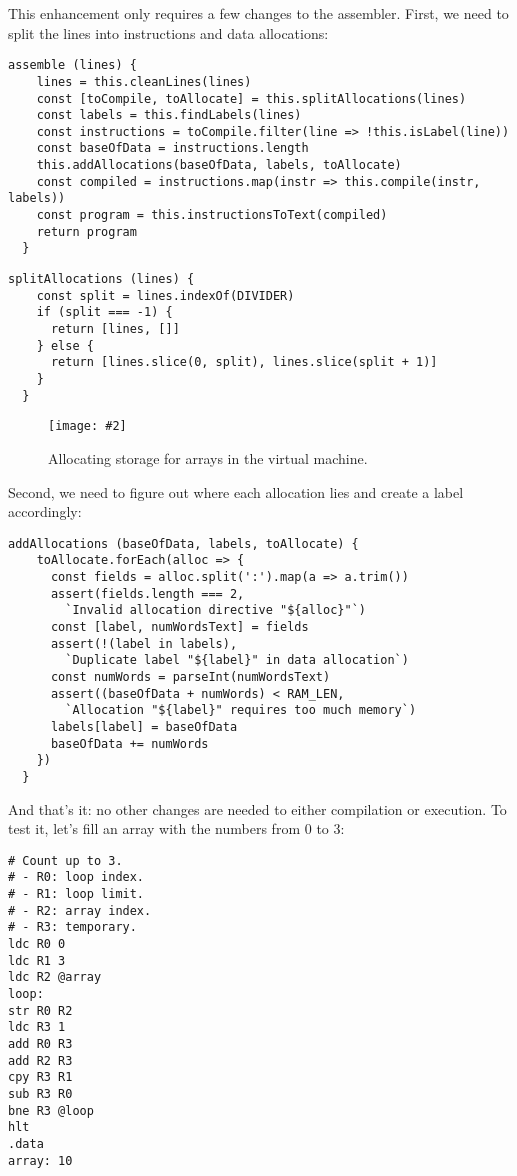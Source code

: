 \documentclass[krantzl]{krantz}
\newcommand{\figpdfhere}[4]{\begin{figure}[h]%
\centering%
\texttt{[image: \#2]}%
\caption{#3}%
\label{#1}%
\end{figure}}
\begin{document}
This enhancement only requires a few changes to the assembler.
First,
we need to split the lines into instructions and data allocations:


\begin{lstlisting}[frame=tblr]
  assemble (lines) {
    lines = this.cleanLines(lines)
    const [toCompile, toAllocate] = this.splitAllocations(lines)
    const labels = this.findLabels(lines)
    const instructions = toCompile.filter(line => !this.isLabel(line))
    const baseOfData = instructions.length
    this.addAllocations(baseOfData, labels, toAllocate)
    const compiled = instructions.map(instr => this.compile(instr, labels))
    const program = this.instructionsToText(compiled)
    return program
  }
\end{lstlisting}



\begin{lstlisting}[frame=tblr]
  splitAllocations (lines) {
    const split = lines.indexOf(DIVIDER)
    if (split === -1) {
      return [lines, []]
    } else {
      return [lines.slice(0, split), lines.slice(split + 1)]
    }
  }
\end{lstlisting}


\figpdfhere{virtual-machine-storage-allocation}{./virtual-machine/storage-allocation.pdf}{Allocating storage for arrays in the virtual machine.}{0.6}


Second,
we need to figure out where each allocation lies and create a label accordingly:


\begin{lstlisting}[frame=tblr]
  addAllocations (baseOfData, labels, toAllocate) {
    toAllocate.forEach(alloc => {
      const fields = alloc.split(':').map(a => a.trim())
      assert(fields.length === 2,
        `Invalid allocation directive "${alloc}"`)
      const [label, numWordsText] = fields
      assert(!(label in labels),
        `Duplicate label "${label}" in data allocation`)
      const numWords = parseInt(numWordsText)
      assert((baseOfData + numWords) < RAM_LEN,
        `Allocation "${label}" requires too much memory`)
      labels[label] = baseOfData
      baseOfData += numWords
    })
  }
\end{lstlisting}



And that’s it:
no other changes are needed to either compilation or execution.
To test it,
let’s fill an array with the numbers from 0 to 3:


\begin{lstlisting}[frame=tblr]
# Count up to 3.
# - R0: loop index.
# - R1: loop limit.
# - R2: array index.
# - R3: temporary.
ldc R0 0
ldc R1 3
ldc R2 @array
loop:
str R0 R2
ldc R3 1
add R0 R3
add R2 R3
cpy R3 R1
sub R3 R0
bne R3 @loop
hlt
.data
array: 10
\end{lstlisting}
\end{document}
